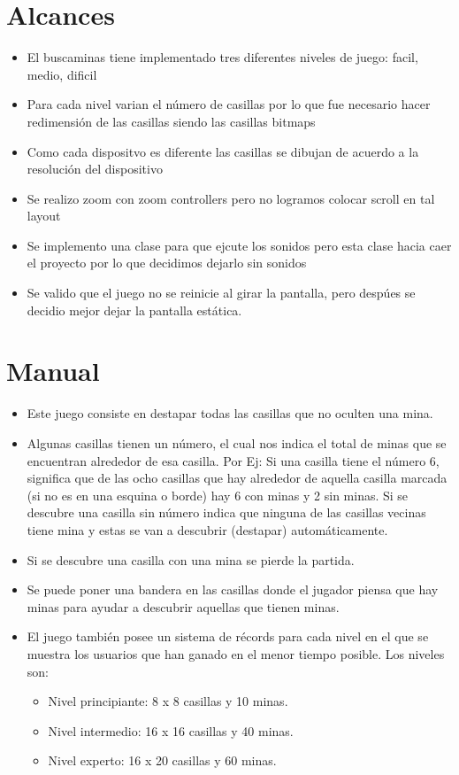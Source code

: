 \documentclass[11pt]{article} %
\begin{document}
\newpage
\section{\fontsize{14}{0} \bf Alcances}
\begin{itemize}
\item El buscaminas tiene implementado tres diferentes niveles de juego: facil, medio, dificil
\item Para cada nivel varian el número de casillas por lo que fue necesario hacer redimensión de las casillas siendo las casillas bitmaps
\item Como cada dispositvo es diferente las casillas se dibujan de acuerdo a la resolución del dispositivo
\item Se realizo zoom con zoom controllers pero no logramos colocar scroll en tal layout
\item Se implemento una clase para que ejcute los sonidos pero esta clase hacia caer el proyecto por lo que decidimos dejarlo sin sonidos
\item Se valido que el juego no se reinicie al girar la pantalla, pero despúes se decidio mejor dejar la pantalla estática.
\end{itemize}

\section{\fontsize{14}{0} \bf Manual}
\begin{itemize}
 \item Este juego consiste en destapar todas las casillas que no oculten una mina.\\
 \item Algunas casillas tienen un número, el cual nos indica el total de minas que se encuentran alrededor de esa casilla. Por Ej: Si una casilla tiene el número 6, significa que de las ocho casillas que hay alrededor de aquella casilla marcada (si no es en una esquina o borde) hay 6 con minas y 2 sin minas. Si se descubre una casilla sin número indica que ninguna de las casillas vecinas tiene mina y estas se van a descubrir (destapar) automáticamente.\\
 \item Si se descubre una casilla con una mina se pierde la partida.\\
 \item Se puede poner una bandera en las casillas donde el jugador piensa que hay minas para ayudar a descubrir aquellas que tienen minas.\\
 \item El juego también posee un sistema de récords para cada nivel en el que se muestra los usuarios que han ganado en el menor tiempo posible. Los niveles son:\\
\begin{itemize}
 \item Nivel principiante: 8 x 8 casillas y 10 minas.
 \item Nivel intermedio: 16 x 16 casillas y 40 minas.
 \item Nivel experto: 16 x 20 casillas y 60 minas.

\end{itemize}
\end{itemize}
\end{document}
